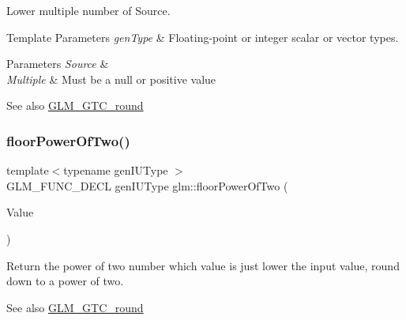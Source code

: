 Lower multiple number of Source.


\begin{DoxyTemplParams}{Template Parameters}
{\em gen\+Type} & Floating-\/point or integer scalar or vector types. \\
\hline
\end{DoxyTemplParams}

\begin{DoxyParams}{Parameters}
{\em Source} & \\
\hline
{\em Multiple} & Must be a null or positive value\\
\hline
\end{DoxyParams}
\begin{DoxySeeAlso}{See also}
\hyperlink{group__gtc__round}{G\+L\+M\+\_\+\+G\+T\+C\+\_\+round} 
\end{DoxySeeAlso}
\mbox{\label{group__gtc__round_gac80f6519c31baae10d8d7bea6735d1fa}} 
\subsubsection{\texorpdfstring{floor\+Power\+Of\+Two()}{floorPowerOfTwo()}\hspace{0.1cm}{\footnotesize\ttfamily [1/2]}}
{\footnotesize\ttfamily template$<$typename gen\+I\+U\+Type $>$ \\
G\+L\+M\+\_\+\+F\+U\+N\+C\+\_\+\+D\+E\+CL gen\+I\+U\+Type glm\+::floor\+Power\+Of\+Two (\begin{DoxyParamCaption}\item[{gen\+I\+U\+Type}]{Value }\end{DoxyParamCaption})}

Return the power of two number which value is just lower the input value, round down to a power of two.

\begin{DoxySeeAlso}{See also}
\hyperlink{group__gtc__round}{G\+L\+M\+\_\+\+G\+T\+C\+\_\+round} 
\end{DoxySeeAlso}
\mbox{\label{group__gtc__round_ga6a5a8f6dd1b2f755e4572bd039062c37}} 
